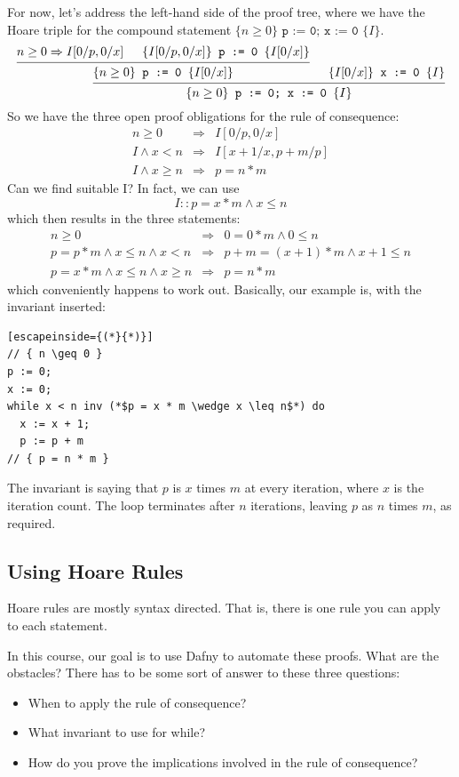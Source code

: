 \documentclass[11pt]{article}
\begin{document}
For now, let's address the left-hand side of the proof tree, where we have the Hoare triple for the compound statement $\{ n \geq 0 \} \texttt{~p := 0; x := 0~} \{ I \}$.
\[
\begin{prooftree}
\hypo{n \geq 0 \Rightarrow I[0/p, 0/x]}
\hypo{\{I[0/p, 0/x]\} \texttt{~p := 0~} \{ I[0/x] \}}
\infer2{\{n \geq 0 \} \texttt{~p := 0~} \{ I[0/x] \}}
\hypo{\{I[0/x]\} \texttt{~x := 0~} \{ I \}}
\infer2{\{ n \geq 0 \} \texttt{~p := 0; x := 0~} \{ I \}}
\end{prooftree}
\]
So we have the three open proof obligations for the rule of consequence:
\begin{eqnarray*}
n \geq 0 &\Rightarrow& I[0/p,0/x] \\
I \wedge x < n &\Rightarrow& I[x+1/x, p+m/p] \\
I \wedge x \geq n &\Rightarrow& p = n * m
\end{eqnarray*}
Can we find suitable I? In fact, we can use 
\[ I:: p = x * m \wedge x \leq n \]
which then results in the three statements:
\begin{eqnarray*}
n \geq 0 &\Rightarrow& 0 = 0 * m \wedge 0 \leq n \\
p = p * m \wedge x \leq n \wedge x < n &\Rightarrow& p + m = (x + 1) * m \wedge x + 1 \leq n \\
p = x * m \wedge x \leq n \wedge x \geq n &\Rightarrow& p = n * m
\end{eqnarray*}
which conveniently happens to work out. Basically, our example is, with the invariant inserted:
\begin{lstlisting}[escapeinside={(*}{*)}]
// { n \geq 0 }
p := 0;
x := 0;
while x < n inv (*$p = x * m \wedge x \leq n$*) do
  x := x + 1;
  p := p + m
// { p = n * m }
\end{lstlisting}
The invariant is saying that $p$ is $x$ times $m$ at every iteration, where $x$ is the iteration count. The loop terminates after $n$ iterations, leaving $p$ as $n$ times $m$, as required.

\subsection*{Using Hoare Rules}
Hoare rules are mostly syntax directed. That is, there is one rule you can apply to each statement. 

In this course, our goal is to use Dafny to automate these proofs. What are the obstacles? There has to be some sort of answer to these three questions:
\begin{itemize}[noitemsep]
\item When to apply the rule of consequence?
\item What invariant to use for while?
\item How do you prove the implications involved in the rule of consequence?
\end{itemize}
\end{document}
